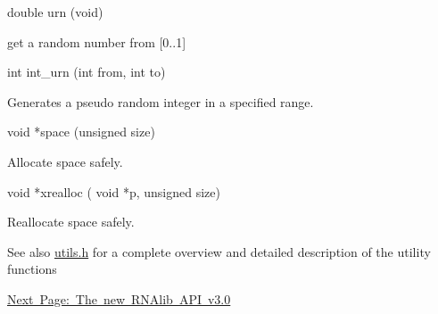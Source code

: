 \begin{DoxyVerb}double urn (void)
\end{DoxyVerb}
 get a random number from \mbox{[}0..1\mbox{]}

\begin{DoxyVerb}int    int_urn (int from, int to)
\end{DoxyVerb}
 Generates a pseudo random integer in a specified range.

\begin{DoxyVerb}void  *space (unsigned size)
\end{DoxyVerb}
 Allocate space safely.

\begin{DoxyVerb}void  *xrealloc ( void *p,
                  unsigned size)
\end{DoxyVerb}
 Reallocate space safely.

\begin{DoxySeeAlso}{See also}
\mbox{\hyperlink{utils_8h}{utils.\+h}} for a complete overview and detailed description of the utility functions
\end{DoxySeeAlso}


\mbox{\hyperlink{mp_example}{Next Page\+: The new R\+N\+Alib A\+PI v3.0}} 